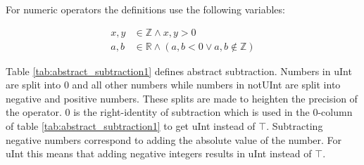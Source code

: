 For numeric operators the definitions use the following variables:

\begin{align*}
x, y &\in \mathbb{Z} \wedge x, y > 0 \\
a, b &\in \mathbb{R} \wedge (a, b < 0 \vee a, b \notin \mathbb{Z})
\end{align*}

Table \ref{tab:abstract_subtraction1} defines abstract subtraction. Numbers in uInt are split into 0 and all other numbers while numbers in notUInt are split into negative and positive numbers. These splits are made to heighten the precision of the operator. 0 is the right-identity of subtraction which is used in the 0-column of table \ref{tab:abstract_subtraction1} to get uInt instead of $\top$. Subtracting negative numbers correspond to adding the absolute value of the number. For uInt this means that adding negative integers results in uInt instead of $\top$.

\begin{table}[htbp]
\centering
{}
\caption{Abstract Subtraction}
\label{tab:abstract_subtraction1}
\end{table}

